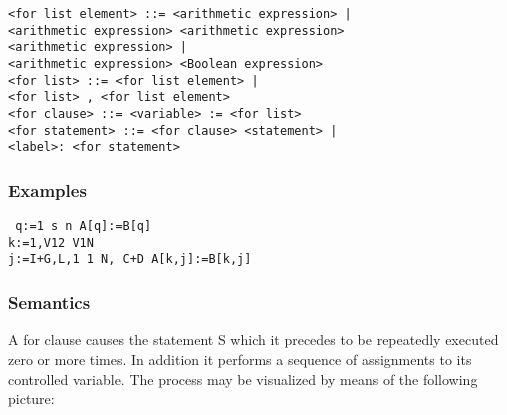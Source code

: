 \documentclass[a4paper,11pt]{article}
\begin{document}
\begin{flushleft}
\vspace{0.2em}\texttt{<for list element> ::= <arithmetic expression> | \\
  \hspace{1.0cm}<arithmetic expression>  <arithmetic expression> \\
  \hspace{1.0cm} <arithmetic expression> |\\
  \hspace{1.0cm}<arithmetic expression>  <Boolean expression>}\\

\vspace{0.2em}\texttt{<for list> ::= <for list element> |\\
  \hspace{1.0cm}<for list> , <for list element>}\\

\vspace{0.2em}\texttt{<for clause> ::=  <variable> := <for list> }\\

\vspace{0.2em}\texttt{<for statement> ::= <for clause> <statement> |\\
  \hspace{1.0cm}<label>: <for statement>}\\
\end{flushleft}


\subsubsection{Examples}

\begin{flushleft}
\texttt{ q:=1  s  n  A[q]:=B[q]\\
 k:=1,V1\mtim{}2  V1\mlt{}N \\
 j:=I+G,L,1  1  N, C+D  A[k,j]:=B[k,j]}\\
\end{flushleft}


\subsubsection{Semantics}
\label{LblForStatementsSemantics}

A for clause causes the statement S which it precedes to be repeatedly
executed zero or more times.  In addition it performs a sequence of
assignments to its controlled variable.  The process may be visualized
by means of the following picture:
\end{document}
